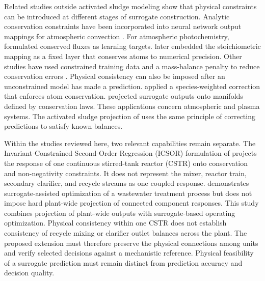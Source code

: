 \documentclass[a4paper,fleqn]{cas-sc}
\begin{document}
Related studies outside activated sludge modeling show that physical constraints can be introduced at different stages of surrogate construction. Analytic conservation constraints have been incorporated into neural network output mappings for atmospheric convection \citep{Beucler2021}. For atmospheric photochemistry, \citet{SturmWexler2020} formulated conserved fluxes as learning targets. \citet{SturmWexler2022} later embedded the stoichiometric mapping as a fixed layer that conserves atoms to numerical precision. Other studies have used constrained training data and a mass-balance penalty to reduce conservation errors \citep{Ruckstuhl2021}. Physical consistency can also be imposed after an unconstrained model has made a prediction. \citet{SturmSilva2025} applied a species-weighted correction that enforces atom conservation. \citet{Valente2025} projected surrogate outputs onto manifolds defined by conservation laws. These applications concern atmospheric and plasma systems. The activated sludge projection of \citet{Selerio2026} uses the same principle of correcting predictions to satisfy known balances.

Within the studies reviewed here, two relevant capabilities remain separate. The Invariant-Constrained Second-Order Regression (ICSOR) formulation of \citet{Selerio2026} projects the response of one continuous stirred-tank reactor (CSTR) onto conservation and non-negativity constraints. It does not represent the mixer, reactor train, secondary clarifier, and recycle streams as one coupled response. \citet{He2023} demonstrates surrogate-assisted optimization of a wastewater treatment process but does not impose hard plant-wide projection of connected component responses. This study combines projection of plant-wide outputs with surrogate-based operating optimization. Physical consistency within one CSTR does not establish consistency of recycle mixing or clarifier outlet balances across the plant. The proposed extension must therefore preserve the physical connections among units and verify selected decisions against a mechanistic reference. Physical feasibility of a surrogate prediction must remain distinct from prediction accuracy and decision quality.
\end{document}

